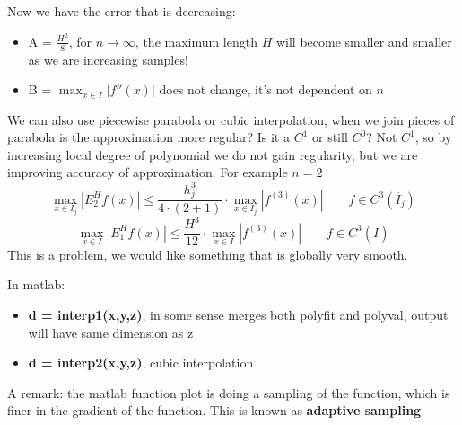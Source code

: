     Now we have the error that is decreasing:
    \begin{itemize}
        \item A = $\frac{H^2}{8}$, for $n\rightarrow\infty$, the maximum length $H$ will become smaller and smaller as we are increasing samples!
        \item B = $\max_{x\in I}\left|f''(x)\right|$ does not change, it's not dependent on $n$
    \end{itemize}
    We can also use piecewise parabola or cubic interpolation, when we join pieces of parabola is the approximation more regular? Is it a $C^1$ or still $C^0$? Not $C^1$, so by increasing local degree of polynomial we do not gain regularity, but we are improving accuracy of approximation. For example $n=2$
    $$
        \max_{x\in I_j}\left|E_2^Hf(x)\right|
        \leq
        \frac{
            h_j^3
        }{
            4\cdot(2+1)
        }\cdot
        \max_{x\in I_j}\left|
            f^{(3)}(x)
        \right|\qquad
        f\in C^3(\overline{I}_j)
    $$
    $$
    \max_{x\in I}\left|E_1^Hf(x)\right|
    \leq
    \frac{
        H^3
    }{
        12
    }\cdot
    \max_{x\in I}\left|
        f^{(3)}(x)
    \right|\qquad
    f\in C^3(\overline{I})
    $$
    This is a problem, we would like something that is globally very smooth.

    In matlab:
    \begin{itemize}
        \item \textbf{d = interp1(x,y,z)}, in some sense merges both polyfit and polyval, output will have same dimension as z
        \item \textbf{d = interp2(x,y,z)}, cubic interpolation
    \end{itemize}
    A remark: the matlab function plot is doing a sampling of the function, which is finer in the gradient of the function. This is known as \textbf{adaptive sampling}

